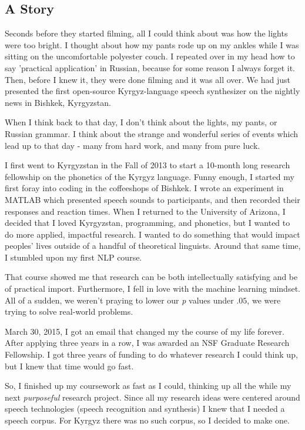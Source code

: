 \documentclass[12pt,a4paper]{article}
\begin{document}
\subsection*{A Story}

Seconds before they started filming, all I could think about was how the lights were too bright. I thought about how my pants rode up on my ankles while I was sitting on the uncomfortable polyester couch. I repeated over in my head how to say 'practical application' in Russian, because for some reason I always forget it. Then, before I knew it, they were done filming and it was all over. We had just presented the first open-source Kyrgyz-language speech synthesizer on the nightly news in Bishkek, Kyrgyzstan.

When I think back to that day, I don't think about the lights, my pants, or Russian grammar. I think about the strange and wonderful series of events which lead up to that day - many from hard work, and many from pure luck.

I first went to Kyrgyzstan in the Fall of 2013 to start a 10-month long research fellowship on the phonetics of the Kyrgyz language. Funny enough, I started my first foray into coding in the coffeeshops of Bishkek. I wrote an experiment in MATLAB which presented speech sounds to participants, and then recorded their responses and reaction times. When I returned to the University of Arizona, I decided that I loved Kyrgyzstan, programming, and phonetics, but I wanted to do more applied, impactful research. I wanted to do something that would impact peoples' lives outside of a handful of theoretical linguists. Around that same time, I stumbled upon my first NLP course.

That course showed me that research can be both intellectually satisfying and be of practical import. Furthermore, I fell in love with the machine learning mindset. All of a sudden, we weren't praying to lower our \textit{p} values under $.05$, we were trying to solve real-world problems.

March 30, 2015, I got an email that changed my the course of my life forever. After applying three years in a row, I was awarded an NSF Graduate Research Fellowship. I got three years of funding to do whatever research I could think up, but I knew that time would go fast.

So, I finished up my coursework as fast as I could, thinking up all the while my next \textit{purposeful} research project. Since all my research ideas were centered around speech technologies (speech recognition and synthesis) I knew that I needed a speech corpus. For Kyrgyz there was no such corpus, so I decided to make one.
\end{document}
